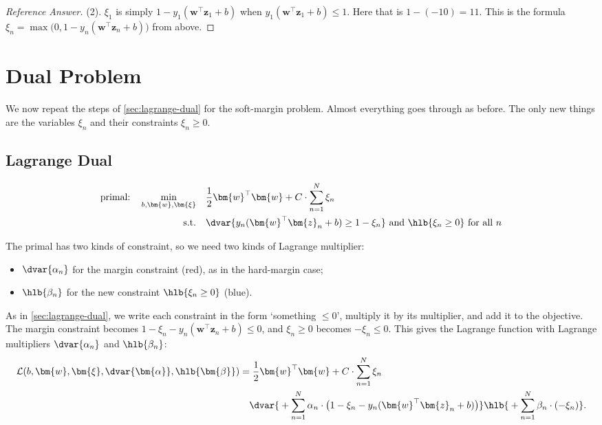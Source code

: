 \begin{proof}[Reference Answer]
    (2). \(\xi_1\) is simply \(1 - y_1 (\bm{w}^\top \bm{z}_1 + b)\) when
    \(y_1 (\bm{w}^\top \bm{z}_1 + b) \le 1\). Here that is \(1 - (-10) =
    11\). This is the formula \(\xi_n = \max\bigl(0, 1 - y_n (\bm{w}^\top
    \bm{z}_n + b)\bigr)\) from above.
\end{proof}

\section{Dual Problem}\label{sec:soft-dual}


We now repeat the steps of \autoref{sec:lagrange-dual} for the soft-margin
problem. Almost everything goes through as before. The only new things are
the variables \(\xi_n\) and their constraints \(\xi_n \ge 0\).

\subsection{Lagrange Dual}

\[
    \begin{aligned}
        \text{primal:} \quad \min_{b, \bm{w}, \bm{\xi}} \quad & \frac{1}{2}
            \bm{w}^\top \bm{w} + C \cdot \sum_{n=1}^N \xi_n\\
        \text{s.t.} \quad & \dvar{y_n (\bm{w}^\top \bm{z}_n + b) \ge 1 -
            \xi_n} \text{ and } \hlb{\xi_n \ge 0} \text{ for all } n
    \end{aligned}
\]

The primal has two kinds of constraint, so we need two kinds of Lagrange
multiplier:
\begin{itemize}
    \item \(\dvar{\alpha_n}\) for the margin constraint (red), as in the
        hard-margin case;
    \item \(\hlb{\beta_n}\) for the new constraint \(\hlb{\xi_n \ge 0}\)
        (blue).
\end{itemize}
As in \autoref{sec:lagrange-dual}, we write each constraint in the form
`something \(\le 0\)', multiply it by its multiplier, and add it to the
objective. The margin constraint becomes \(1 - \xi_n - y_n (\bm{w}^\top
\bm{z}_n + b) \le 0\), and \(\xi_n \ge 0\) becomes \(-\xi_n \le 0\). This
gives the Lagrange function with Lagrange multipliers \(\dvar{\alpha_n}\) and
\(\hlb{\beta_n}\):
\[
    \begin{aligned}
        \mathcal{L}(b, \bm{w}, \bm{\xi}, \dvar{\bm{\alpha}},
            \hlb{\bm{\beta}}) &= \frac{1}{2} \bm{w}^\top \bm{w} + C \cdot
            \sum_{n=1}^N \xi_n\\
        &\quad \dvar{{} + \sum_{n=1}^N \alpha_n \cdot \bigl( 1 - \xi_n - y_n
            (\bm{w}^\top \bm{z}_n + b) \bigr)} \hlb{{} + \sum_{n=1}^N
            \beta_n \cdot (-\xi_n)}.
    \end{aligned}
\]

